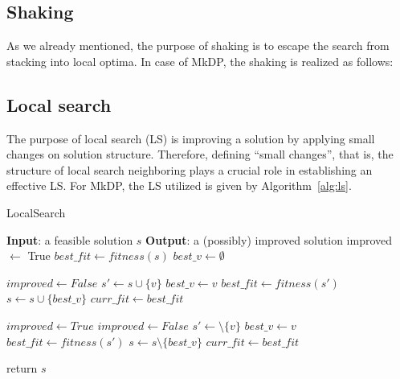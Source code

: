 \documentclass[dvipsnames,format=sigconf,anonymous=true,review=true]{acmart}
\begin{document}
   \subsection{Shaking}
    As we already mentioned, the purpose of shaking is to escape the search from stacking into   local optima. In case of MkDP, the shaking is realized as follows:  
   \subsection{Local search}
  The purpose of local search (LS) is improving a solution by applying small changes on solution structure. Therefore, defining  ``small changes'', that is, the structure of local search neighboring plays a crucial role in establishing an effective LS.  For MkDP, the LS utilized is given by Algorithm~\ref{alg:ls}.
  
  
  \begin{algorithm}[!t] 
  	\caption{LocalSearch}\label{alg:ls}
  	\begin{algorithmic}[1]
  		\STATE \textbf{Input}: a feasible solution $s$
  		\STATE \textbf{Output}: a (possibly) improved solution
  		\STATE improved $\gets$ True
  		\STATE $best\_fit \gets fitness(s)$
  		\STATE $best\_v \gets \emptyset$
 
  		     \STATE $improved \gets  False$
  		          \STATE $s' \gets s \cup \{v\}$
  		              \STATE $best\_v \gets v$
  		              \STATE $best\_fit \gets fitness(s')$
  		          \ENDIF
  		     \ENDFOR
  		         \STATE $s \gets s \cup \{best\_v\}$
  		         \STATE $curr\_fit \gets best\_fit$
  		     \ENDIF

  		\ENDWHILE   		    
  		 \STATE  $improved \gets True$
  		   \STATE $improved \gets  False$
  		       \STATE $s' \gets \setminus \{v\}$
  		             \STATE $best\_v \gets v$
  		             \STATE $best\_fit \gets fitness(s')$
  		       \ENDIF
  		       \STATE $s \gets s \setminus \{best\_v\}$
  		       \STATE $curr\_fit \gets best\_fit$
  		       \ENDIF
  		       
  		    \ENDFOR
  		\ENDWHILE
  		\STATE return $s$
  	\end{algorithmic}
\end{algorithm}
\end{document}
